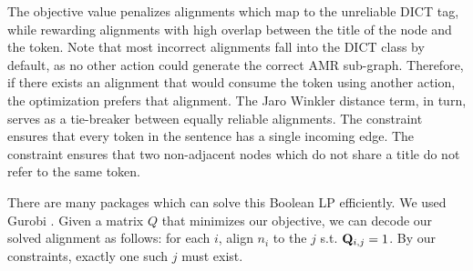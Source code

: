 The objective value penalizes alignments which map to the unreliable DICT tag,
  while rewarding alignments with high overlap between the title of the node and
  the token.
Note that most incorrect alignments fall into the DICT class by default, as no other
  action could generate the correct AMR sub-graph.
Therefore, if there exists an alignment that would consume the token using another
  action, the optimization prefers that alignment.
The Jaro Winkler distance term, in turn, serves as a tie-breaker between equally
  reliable alignments.
The constraint  ensures that every token in the sentence has
  a single incoming edge.
The constraint  ensures that two non-adjacent nodes which do
  not share a title do not refer to the same token.

%
%
%
%
%

There are many packages which can solve this Boolean LP efficiently.
We used Gurobi \needcite.
Given a matrix $Q$ that minimizes our objective, we can decode our solved alignment 
  as follows: for each $i$, align $n_i$ to the $j$ s.t. $\mathbf{Q}_{i,j} = 1$. 
By our constraints, exactly one such $j$ must exist.
